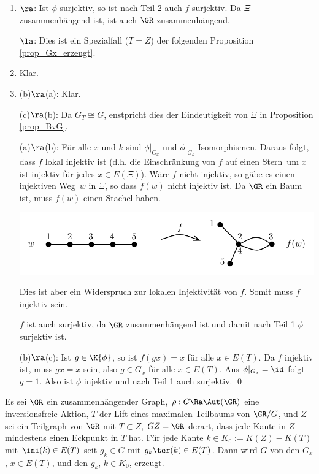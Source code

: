 \bew \begin{enumerate}
\item \glqq$\ra$\grqq: Ist $\phi$ surjektiv, so ist nach Teil 2 auch
$f$ surjektiv. Da $\Xi$ zusammenhängend ist, ist auch $\GR$
zusammenhängend.

\glqq$\la$\grqq: Dies ist ein Spezialfall ($T=Z$) der folgenden
Proposition \ref{prop_Gx_erzeugt}.
\item Klar.
\item
\glqq (b)$\ra$(a)\grqq: Klar.

\glqq (c)$\ra$(b)\grqq: Da $G_T\cong G$, enstpricht dies der 
Eindeutigkeit von $\Xi$ in Proposition \ref{prop_BvG}.

\glqq (a)$\ra$(b)\grqq: Für alle $x$ und $k$ sind
$\phi|_{G_x}$ und $\phi|_{G_k}$ Isomorphismen.
Daraus folgt, dass $f$ lokal injektiv ist (d.h. die Einschränkung
von $f$ auf einen \glqq Stern\grqq\ um $x$ ist injektiv für jedes
$x\in E(\Xi)$).
Wäre $f$ nicht injektiv, so gäbe es einen \glqq injektiven Weg\grqq\
$w$ in $\Xi$, so dass $f(w)$ nicht injektiv ist.
Da $\GR$ ein Baum ist, muss $f(w)$ einen Stachel haben.
\begin{center}
	\includegraphics{grugraImages/winjektiv}
\end{center}
Dies ist aber ein Widerspruch zur lokalen Injektivität von $f$.
Somit muss $f$ injektiv sein.

$f$ ist auch surjektiv, da $\GR$ zusammenhängend ist und damit nach
Teil 1 $\phi$ surjektiv ist.

\glqq (b)$\ra$(c)\grqq: Ist $g\in\K{\phi}$, so ist $f(gx)=x$
für alle $x\in E(T)$. Da $f$ injektiv ist, muss $gx=x$ sein,
also $g\in G_x$ für alle $x\in E(T)$. Aus $\phi|_{G_x}=\id$
folgt $g=1$. Also ist $\phi$ injektiv und nach Teil 1 auch
surjektiv.
\qed
\end{enumerate}

\PROP \label{prop_Gx_erzeugt}
Es sei $\GR$ ein zusammenhängender Graph, $\rho:G\Ra\Aut(\GR)$
eine inversionsfreie Aktion, $T$ der Lift eines maximalen
Teilbaums von $\GR/G$, und $Z$ sei ein Teilgraph von $\GR$ mit
$T\subset Z$, $GZ=\GR$ derart, dass jede Kante in $Z$ mindestens
einen Eckpunkt in $T$ hat.
Für jede Kante $k\in K_0 := K(Z)-K(T)$ mit $\ini(k)\in E(T)$
seit $g_k\in G$ mit $g_k \ter(k)\in E(T)$.
Dann wird $G$ von den $G_x$, $x\in E(T)$, und den $g_k$, $k\in K_0$,
erzeugt.

